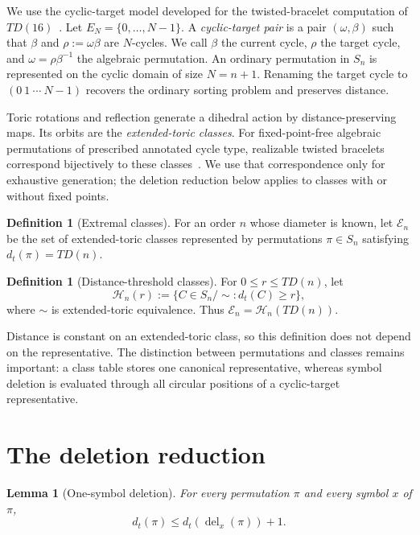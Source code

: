 \documentclass[11pt]{article}
\newtheorem{lemma}[theorem]{Lemma}
\theoremstyle{definition}
\newtheorem{definition}[theorem]{Definition}
\theoremstyle{remark}
\newcommand{\En}{\mathcal E}
\newcommand{\Hn}{\mathcal H}
\newcommand{\dist}{d_t}
\newcommand{\Del}{\operatorname{del}}
\newcommand{\cycle}[1]{(#1)}
\begin{document}
We use the cyclic-target model developed for the twisted-bracelet computation
of $TD(16)$~\cite{SilvaEtAl2026}.  Let $E_N=\{0,\ldots,N-1\}$.  A
\emph{cyclic-target pair} is a pair $(\omega,\beta)$ such that $\beta$ and
$\rho:=\omega\beta$ are $N$-cycles.  We call $\beta$ the current cycle,
$\rho$ the target cycle, and $\omega=\rho\beta^{-1}$ the algebraic
permutation.  An ordinary permutation in $S_n$ is represented on the cyclic
domain of size $N=n+1$.  Renaming the target cycle to
$\cycle{0\ 1\ \cdots\ N-1}$ recovers the ordinary sorting problem and
preserves distance.

Toric rotations and reflection generate a dihedral action by
distance-preserving maps.  Its orbits are the \emph{extended-toric classes}.
For fixed-point-free algebraic permutations of prescribed annotated cycle
type, realizable twisted bracelets correspond bijectively to these
classes~\cite{SilvaEtAl2026}.  We use that correspondence only for exhaustive
generation; the deletion reduction below applies to classes with or without
fixed points.

\begin{definition}[Extremal classes]
For an order $n$ whose diameter is known, let $\En_n$ be the set of
extended-toric classes represented by permutations $\pi\in S_n$ satisfying
$\dist(\pi)=TD(n)$.
\end{definition}

\begin{definition}[Distance-threshold classes]
For $0\leq r\leq TD(n)$, let
\[
  \Hn_n(r):=\{C\in S_n/{\sim}:\dist(C)\geq r\},
\]
where $\sim$ is extended-toric equivalence.  Thus
$\En_n=\Hn_n(TD(n))$.
\end{definition}

Distance is constant on an extended-toric class, so this definition does not
depend on the representative.  The distinction between permutations and
classes remains important: a class table stores one canonical representative,
whereas symbol deletion is evaluated through all circular positions of a
cyclic-target representative.

\section{The deletion reduction}\label{sec:deletion}

\begin{lemma}[One-symbol deletion]\label{lem:deletion}
For every permutation $\pi$ and every symbol $x$ of $\pi$,
\[
  \dist(\pi)\leq \dist(\Del_x(\pi))+1.
\]
\end{lemma}
\end{document}
